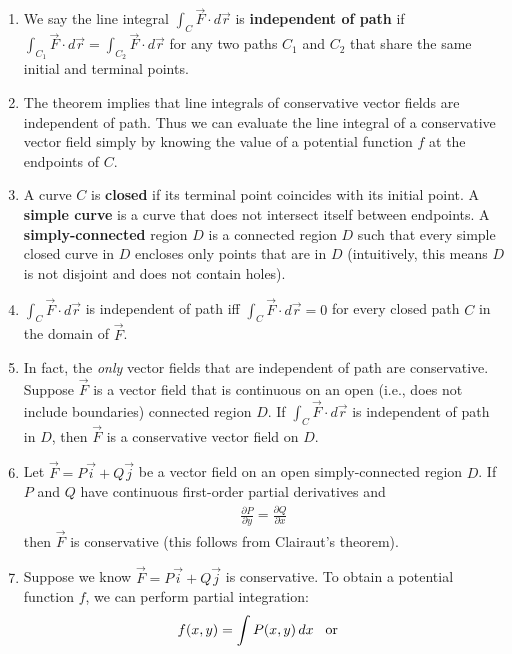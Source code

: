 \documentclass[10pt]{article}
\begin{document}
\begin{multicols*}{2}
\begin{enumerate}
\begin{enumerate}
        \item We say the line integral $\int_C \vec{F} \cdot d\vec{r}$ is \textbf{independent of path} if $\int_{C_1} \vec{F} \cdot d\vec{r} = \int_{C_2} \vec{F} \cdot d\vec{r}$ for any two paths $C_1$ and $C_2$ that share the same initial and terminal points. 
        \item The theorem implies that line integrals of conservative vector fields are independent of path. Thus we can evaluate the line integral of a conservative vector field simply by knowing the value of a potential function $f$ at the endpoints of $C$.
        \item A curve $C$ is \textbf{closed} if its terminal point coincides with its initial point. A \textbf{simple curve} is a curve that does not intersect itself between endpoints. A \textbf{simply-connected} region $D$ is a connected region $D$ such that every simple closed curve in $D$ encloses only points that are in $D$ (intuitively, this means $D$ is not disjoint and does not contain holes).
        \item $\int_C \vec{F} \cdot d\vec{r}$ is independent of path iff $\int_C \vec{F} \cdot d\vec{r}=0$ for every closed path $C$ in the domain of $\vec{F}$.
        \item In fact, the \textit{only} vector fields that are independent of path are conservative. Suppose $\vec{F}$ is a vector field that is continuous on an open (i.e., does not include boundaries) connected region $D$. If $\int_C \vec{F} \cdot d\vec{r}$ is independent of path in $D$, then $\vec{F}$ is a conservative vector field on $D$.
        \item Let $\vec{F} = P\vec{i} + Q\vec{j}$ be a vector field on an open simply-connected region $D$. If $P$ and $Q$ have continuous first-order partial derivatives and  
        \begin{align*}
            \frac{\partial P}{\partial y} = \frac{\partial Q}{\partial x} 
        \end{align*}
        then $\vec{F}$ is conservative (this follows from Clairaut's theorem).
        \item Suppose we know $\vec{F} = P\vec{i} + Q\vec{j}$ is conservative. To obtain a potential function $f$, we can perform partial integration:
        \begin{align*}
            f(x,y) = \int P(x,y) \,dx \hspace{3mm} \text{or} \hspace{3mm}

\end{align*}
\end{enumerate}
\end{enumerate}
\end{multicols*}
\end{document}
